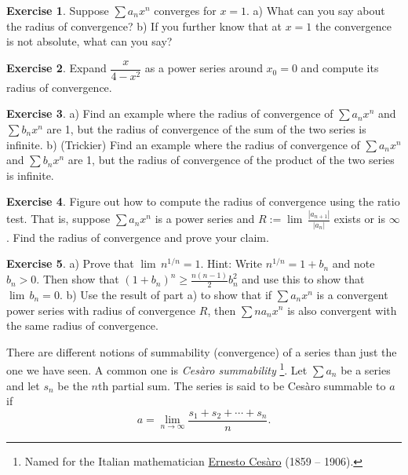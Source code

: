 \documentclass[12pt]{book}
\newcommand{\abs}[1]{\left\lvert {#1} \right\rvert}
\newcommand{\myindex}[1]{#1\index{#1}}
\theoremstyle{plain}
\theoremstyle{remark}
\theoremstyle{definition}
\newenvironment{exnote}{\small}{}
\theoremstyle{exercise}
\newtheorem{exercise}{Exercise}[section]
\theoremstyle{example}
\begin{document}
\begin{exercise}
Suppose $\sum a_n x^n$ converges for $x=1$.
a) What can you say about the radius of convergence?
b) If you further know that at $x=1$ the convergence is not absolute,
what can you say?
\end{exercise}

\begin{exercise}
Expand
$\dfrac{x}{4-x^2}$ as a power series around $x_0 = 0$ and compute its radius
of convergence.
\end{exercise}

\begin{exercise}
a) Find an example where the radius of convergence of $\sum a_n x^n$ and
$\sum b_n x^n$ are 1, but the radius of convergence of
the sum of the two series is infinite.
b) (Trickier)
Find an example where the radius of convergence of $\sum a_n x^n$ and
$\sum b_n x^n$ are 1, but the radius of convergence of
the product of the two series is infinite.
\end{exercise}

\begin{exercise}
Figure out how to compute the radius of convergence using the ratio test.
That is, suppose $\sum a_n x^n$ is a power series and
$R := \lim \, \frac{\abs{a_{n+1}}}{\abs{a_n}}$ exists or is $\infty$.
Find the radius of convergence and prove your claim.
\end{exercise}

\begin{exercise}
a) Prove that $\lim \, n^{1/n} = 1$.  Hint:  Write $n^{1/n} = 1+b_n$ and
note $b_n > 0$.  Then show that ${(1+b_n)}^n \geq 
\frac{n(n-1)}{2}b_n^2$ and use this to show that $\lim \, b_n = 0$. b) Use
the result of part a) to show that if $\sum a_n x^n$ is a convergent power series with
radius of convergence $R$, then $\sum n a_n x^n$ is also convergent with the
same radius of convergence.
\end{exercise}

\begin{exnote}
There are different notions of summability (convergence)
of a series
than just the one we have seen.
A common one is \emph{\myindex{Ces{\`a}ro summability}}%
\footnote{Named for the Italian mathematician
\href{http://en.wikipedia.org/wiki/Ernesto_Ces\%C3\%A0ro}{Ernesto Ces{\`a}ro}
(1859 -- 1906).}.  Let $\sum a_n$ be a series
and let $s_n$ be the $n$th partial sum.  The series is said to
be Ces{\`a}ro summable to $a$ if
\begin{equation*}
a = \lim_{n\to \infty} \frac{s_1 + s_2 + \cdots + s_n}{n} .
\end{equation*}
\end{exnote}
\end{document}
